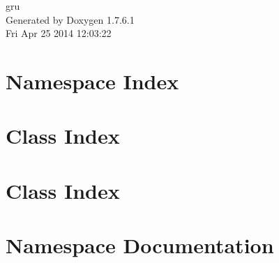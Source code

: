 \documentclass[a4paper]{book}
\begin{document}
\hypersetup{pageanchor=false,citecolor=blue}
\begin{titlepage}
\vspace*{7cm}
\begin{center}
{\Large gru }\\
\vspace*{1cm}
{\large \-Generated by Doxygen 1.7.6.1}\\
\vspace*{0.5cm}
{\small Fri Apr 25 2014 12:03:22}\\
\end{center}
\end{titlepage}
\clearemptydoublepage
{}
\tableofcontents
\clearemptydoublepage
{}
\hypersetup{pageanchor=true,citecolor=blue}
\chapter{\-Namespace \-Index}

\chapter{\-Class \-Index}

\chapter{\-Class \-Index}

\chapter{\-Namespace \-Documentation}





\end{document}
